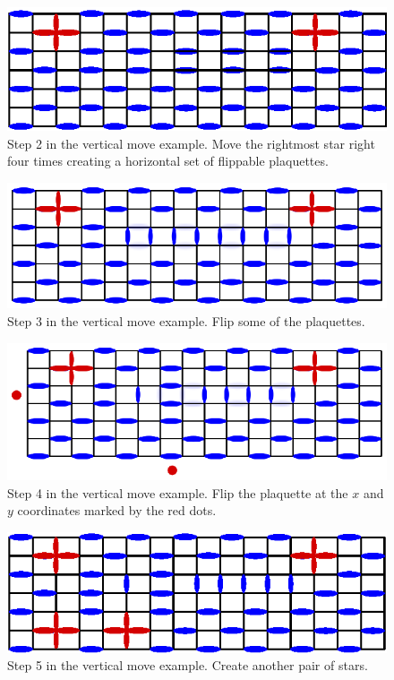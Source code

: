 \documentclass[aps,floatfix,11pt]{revtex4-1}
\begin{document}
\begin{figure}[h]
    \centering
    \includegraphics[width=8.5 cm]{ex_vert_mv_2}
    \caption{Step 2 in the vertical move example. Move the rightmost star right four times creating
    a horizontal set of flippable plaquettes.\label{fig:ex_vert_mv_2}}
\end{figure}

\begin{figure}[h]
    \centering
    \includegraphics[width=8.5 cm]{ex_vert_mv_3}
    \caption{Step 3 in the vertical move example. Flip some of the plaquettes.\label{fig:ex_vert_mv_3}}
\end{figure}


\begin{figure}[h]
    \centering
    \includegraphics[width=8.5 cm]{ex_vert_mv_4}
    \caption{Step 4 in the vertical move example. Flip the plaquette at the $x$ and $y$ coordinates
    marked by the red dots.\label{fig:ex_vert_mv_4}}
\end{figure}


\begin{figure}[h]
    \centering
    \includegraphics[width=8.5 cm]{ex_vert_mv_5}
    \caption{Step 5 in the vertical move example. Create another pair of stars.\label{fig:ex_vert_mv_5}}
\end{figure}
\end{document}
